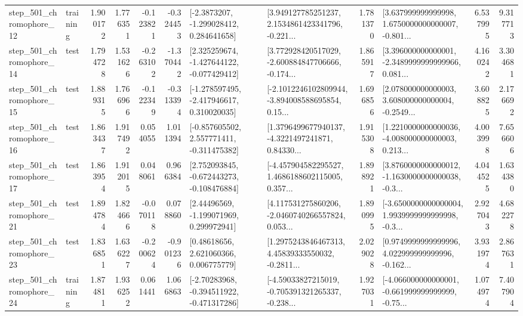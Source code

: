 \begin{tabular}{llrrrrllrlrr}
  step\_501\_chromophore\_12 &  training &      1.900172 &    1.776351 &     -0.123821 & -0.324453 &     [-2.3873207, -1.299028412, 0.284641658] &  [3.949127785251237, 2.1534861423341796, -0.221... &       1.781370 &  [3.637999999999998, 1.6750000000000007, -0.801... &            6.537995 &          9.317713 \\
  step\_501\_chromophore\_14 &      test &      1.794728 &    1.531626 &     -0.263102 & -1.370442 &   [2.325259674, -1.427644122, -0.077429412] &  [3.772928420517029, -2.600884847706666, -0.174... &       1.865917 &  [3.396000000000001, -2.3489999999999966, 0.081... &            4.160242 &          3.304681 \\
  step\_501\_chromophore\_15 &      test &      1.889315 &    1.766966 &     -0.122349 & -0.313394 &   [-1.278597495, -2.417946617, 0.310020035] &  [-2.1012246102809944, -3.894008588695854, 0.15... &       1.696856 &  [2.078000000000003, 3.608000000000004, -0.2549... &            3.608825 &          2.176692 \\
  step\_501\_chromophore\_16 &      test &      1.863437 &    1.917492 &      0.054055 &  1.011394 &   [-0.857605502, 2.557771411, -0.311475382] &  [1.3796499677940137, -4.3221497241871, 0.84330... &       1.915308 &  [1.2210000000000036, -4.008000000000003, 0.213... &            4.003998 &          7.656606 \\
  step\_501\_chromophore\_17 &      test &      1.863954 &    1.912015 &      0.048061 &  0.966384 &   [2.752093845, -0.672443273, -0.108476884] &  [-4.457904582295527, 1.4686188602115005, 0.357... &       1.898921 &  [3.8760000000000012, -1.1630000000000038, -0.3... &            4.044525 &          1.634380 \\
  step\_501\_chromophore\_21 &      test &      1.894784 &    1.824666 &     -0.070118 &  0.078860 &     [2.44496569, -1.199071969, 0.299972941] &  [4.117531275860206, -2.0460740266557824, 0.053... &       1.890995 &  [-3.6500000000000004, 1.9939999999999998, -0.3... &            2.927043 &          4.682278 \\
  step\_501\_chromophore\_23 &      test &      1.836851 &    1.636227 &     -0.200624 & -0.901236 &      [0.48618656, 2.621060366, 0.006775779] &  [1.2975243846467313, 4.45839333550032, -0.2811... &       2.029028 &  [0.9749999999999996, 4.022999999999996, -0.162... &            3.931974 &          2.867631 \\
  step\_501\_chromophore\_24 &  training &      1.874811 &    1.936252 &      0.061441 &  1.066863 &   [-2.70283968, -0.394511922, -0.471317286] &  [-4.59033827215019, -0.705391321265337, -0.238... &       1.927031 &  [-4.066000000000001, -0.661999999999999, -0.75... &            1.074974 &          7.407904 \\

\end{tabular}
